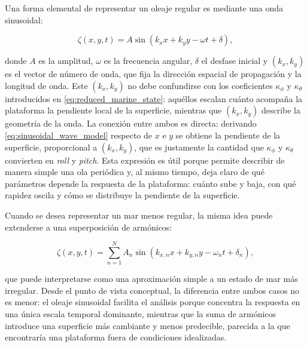 \documentclass[12pt,a4paper]{report}
\begin{document}
Una forma elemental de representar un oleaje regular es mediante una onda
sinusoidal:

\begin{equation}
\zeta(x,y,t) = A \sin(k_x x + k_y y - \omega t + \delta),
\label{eq:sinusoidal_wave_model}
\end{equation}

donde \(A\) es la amplitud, \(\omega\) es la frecuencia angular, \(\delta\) el
desfase inicial y \((k_x,k_y)\) es el vector de número de onda, que fija la
dirección espacial de propagación y la longitud de onda. Este \((k_x,k_y)\) no
debe confundirse con los coeficientes \(\kappa_\phi\) y \(\kappa_\theta\)
introducidos en \eqref{eq:reduced_marine_state}: aquéllos escalan cuánto acompaña
la plataforma la pendiente local de la superficie, mientras que \((k_x,k_y)\)
describe la geometría de la onda. La conexión entre ambos es directa: derivando
\eqref{eq:sinusoidal_wave_model} respecto de \(x\) e \(y\) se obtiene la pendiente
de la superficie, proporcional a \((k_x,k_y)\), que es justamente la cantidad que
\(\kappa_\phi\) y \(\kappa_\theta\) convierten en \emph{roll} y \emph{pitch}. Esta
expresión es útil porque permite describir de manera simple una ola periódica y,
al mismo tiempo, deja claro de qué parámetros depende la respuesta de la
plataforma: cuánto sube y baja, con qué rapidez oscila y cómo se distribuye la
pendiente de la superficie.

Cuando se desea representar un mar menos regular, la misma idea puede
extenderse a una superposición de armónicos:

\begin{equation}
\zeta(x,y,t) = \sum_{n=1}^{N} A_n \sin(k_{x,n} x + k_{y,n} y - \omega_n t + \delta_n),
\label{eq:harmonic_wave_model}
\end{equation}

que puede interpretarse como una aproximación simple a un estado de mar más
irregular. Desde el punto de vista conceptual, la diferencia entre ambos casos
no es menor: el oleaje sinusoidal facilita el análisis porque concentra la
respuesta en una única escala temporal dominante, mientras que la suma de
armónicos introduce una superficie más cambiante y menos predecible, parecida a
la que encontraría una plataforma fuera de condiciones idealizadas.
\end{document}
